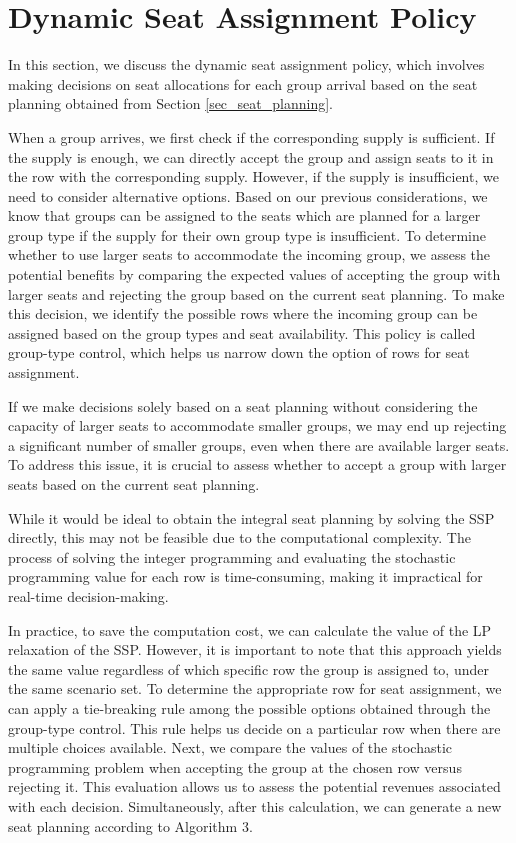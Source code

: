 \section{Dynamic Seat Assignment Policy}\label{sec_dynamic}
In this section, we discuss the dynamic seat assignment policy, which involves making decisions on seat allocations for each group arrival based on the seat planning obtained from Section \ref{sec_seat_planning}.

When a group arrives, we first check if the corresponding supply is sufficient. If the supply is enough, we can directly accept the group and assign seats to it in the row with the corresponding supply. However, if the supply is insufficient, we need to consider alternative options. Based on our previous considerations, we know that groups can be assigned to the seats which are planned for a larger group type if the supply for their own group type is insufficient. To determine whether to use larger seats to accommodate the incoming group, we assess the potential benefits by comparing the expected values of accepting the group with larger seats and rejecting the group based on the current seat planning.
To make this decision, we identify the possible rows where the incoming group can be assigned based on the group types and seat availability. This policy is called group-type control, which helps us narrow down the option of rows for seat assignment.


If we make decisions solely based on a seat planning without considering the capacity of larger seats to accommodate smaller groups, we may end up rejecting a significant number of smaller groups, even when there are available larger seats. To address this issue, it is crucial to assess whether to accept a group with larger seats based on the current seat planning.

While it would be ideal to obtain the integral seat planning by solving the SSP directly, this may not be feasible due to the computational complexity. The process of solving the integer programming and evaluating the stochastic programming value for each row is time-consuming, making it impractical for real-time decision-making.

In practice, to save the computation cost, we can calculate the value of the LP relaxation of the SSP. However, it is important to note that this approach yields the same value regardless of which specific row the group is assigned to, under the same scenario set. To determine the appropriate row for seat assignment, we can apply a tie-breaking rule among the possible options obtained through the group-type control. This rule helps us decide on a particular row when there are multiple choices available. Next, we compare the values of the stochastic programming problem when accepting the group at the chosen row versus rejecting it. This evaluation allows us to assess the potential revenues associated with each decision. Simultaneously, after this calculation, we can generate a new seat planning according to Algorithm 3.

